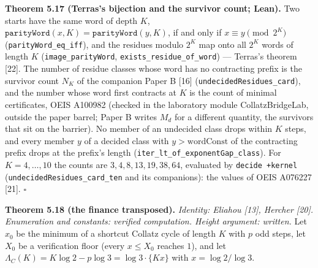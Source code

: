 \documentclass[12pt]{article}
\begin{document}
\textbf{Theorem 5.17 (Terras's bijection and the survivor count; Lean).}
Two starts have the same word of depth \(K\),
\(\mathtt{parityWord}(x,K)=\mathtt{parityWord}(y,K)\), if and only if
\(x\equiv y\pmod{2^K}\) (\texttt{\nolinkurl{parityWord_eq_iff}}), and
the residues modulo \(2^K\) map onto all \(2^K\) words of length \(K\)
(\texttt{\nolinkurl{image_parityWord}},
\texttt{\nolinkurl{exists_residue_of_word}}) --- Terras's theorem
{[}22{]}. The number of residue classes whose word has no contracting
prefix is the survivor count \(N_K\) of the companion Paper B {[}16{]}
(\texttt{\nolinkurl{undecidedResidues_card}}), and the number whose word
first contracts at \(K\) is the count of minimal certificates, OEIS
A100982 (checked in the laboratory module CollatzBridgeLab, outside the
paper barrel; Paper B writes \(M_d\) for a different quantity, the
survivors that sit on the barrier). No member of an undecided class
drops within \(K\) steps, and every member \(y\) of a decided class with
\(y>\mathrm{wordConst}\) of the contracting prefix drops at the prefix's
length (\texttt{\nolinkurl{iter_lt_of_exponentGap_class}}). For
\(K=4,\dots,10\) the counts are \(3,4,8,13,19,38,64\), evaluated by
\texttt{decide\ +kernel}
(\texttt{\nolinkurl{undecidedResidues_card_ten}} and its companions):
the values of OEIS A076227 {[}21{]}. \(\square\)

\textbf{Theorem 5.18 (the finance transposed).} \emph{Identity: Eliahou
{[}13{]}, Hercher {[}20{]}. Enumeration and constants: verified
computation. Height argument: written.} Let \(x_0\) be the minimum of a
shortcut Collatz cycle of length \(K\) with \(p\) odd steps, let \(X_0\)
be a verification floor (every \(x\le X_0\) reaches \(1\)), and let
\(\Lambda_C(K)=K\log2-p\log3=\log3\cdot\{Kx\}\) with \(x=\log2/\log3\).
\end{document}
